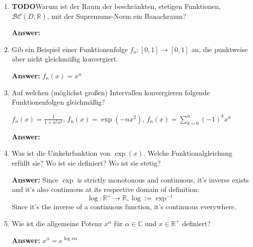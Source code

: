 \documentclass[11pt]{article}
\begin{document}
\begin{enumerate}
\item \textbf{TODO}Warum ist der Raum der beschränkten, stetigen Funktionen, $\mathcal{BC}(D,\mathbb{R})$, mit der Supremums-Norm ein Banachraum?

\textbf{Answer:}

\item Gib ein Beispiel einer Funktionenfolge $f_n\colon [0,1] \to [0,1]$ an, die punktweise aber nicht gleichmäßig konvergiert.

\textbf{Answer:} $f_n(x) = x^n$
\item Auf welchen (möglichst großen) Intervallen konvergieren folgende Funktionenfolgen gleichmäßig?

\begin{center}
    $f_n(x) = \frac{1}{1 + n^2 x^2}$, $f_n(x) = \exp(-nx^2)$, $f_n(x) = \sum_{k=0}^n{(-1)^k x^k}$
\end{center}

\textbf{Answer:}
\item Was ist die Umkehrfunktion von $\exp(x)$. Welche Funktionalgleichung erfüllt sie? Wo
ist sie definiert? Wo ist sie stetig?

\textbf{Answer:} Since $\exp$ is strictly monotonous and continuous, it's inverse exists and it's also continuous at its respective domain of definition: $$\log\colon \mathbb{R}^+ \to \mathbb{R}, \log := \exp^{-1}$$
Since it's the inverse of a continuous function, it's continuous everywhere.
\item Wie ist die allgemeine Potenz $x^\alpha$ für $\alpha \in \mathbb{C}$ und $x \in \mathbb{R}^+$ definiert?

\textbf{Answer:} $x^\alpha = e^{\log{x} \alpha}$

\end{enumerate}
\end{document}
